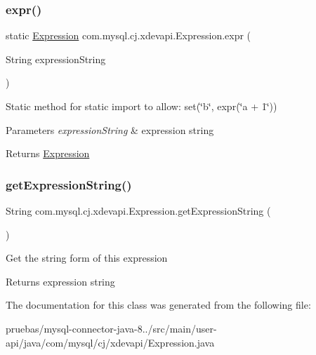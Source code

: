 \subsubsection{\texorpdfstring{expr()}{expr()}}
{\footnotesize\ttfamily static \mbox{\hyperlink{classcom_1_1mysql_1_1cj_1_1xdevapi_1_1_expression}{Expression}} com.\+mysql.\+cj.\+xdevapi.\+Expression.\+expr (\begin{DoxyParamCaption}\item[{String}]{expression\+String }\end{DoxyParamCaption})\hspace{0.3cm}{\ttfamily [static]}}

Static method for static import to allow\+: {\ttfamily set(\char`\"{}b\char`\"{}, expr(\char`\"{}a + 1\char`\"{}))}


\begin{DoxyParams}{Parameters}
{\em expression\+String} & expression string \\
\hline
\end{DoxyParams}
\begin{DoxyReturn}{Returns}
\mbox{\hyperlink{classcom_1_1mysql_1_1cj_1_1xdevapi_1_1_expression}{Expression}} 
\end{DoxyReturn}
\mbox{\label{classcom_1_1mysql_1_1cj_1_1xdevapi_1_1_expression_a2ca4402a9e5b44533844931a24ccda22}} 
\subsubsection{\texorpdfstring{get\+Expression\+String()}{getExpressionString()}}
{\footnotesize\ttfamily String com.\+mysql.\+cj.\+xdevapi.\+Expression.\+get\+Expression\+String (\begin{DoxyParamCaption}{ }\end{DoxyParamCaption})}

Get the string form of this expression

\begin{DoxyReturn}{Returns}
expression string 
\end{DoxyReturn}


The documentation for this class was generated from the following file\+:\begin{DoxyCompactItemize}
\item 
pruebas/mysql-\/connector-\/java-\/8../src/main/user-\/api/java/com/mysql/cj/xdevapi/Expression.\+java\end{DoxyCompactItemize}

